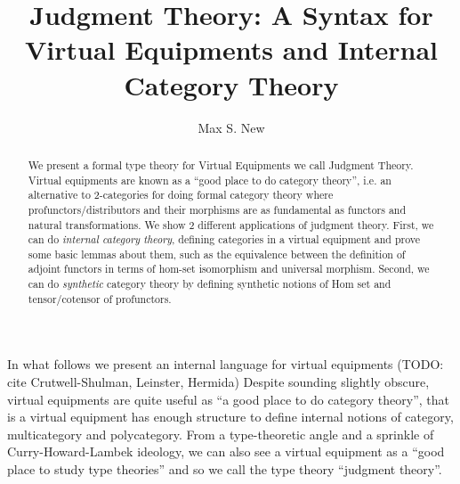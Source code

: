 \documentclass{article}
\begin{document}
\newtheorem{theorem}{Theorem}
\newtheorem{lemma}{Lemma}
\newtheorem{definition}{Definition}
\newcommand{\pto}{\nrightarrow}
\newcommand{\pfrom}{\nleftarrow}
\newcommand{\vcat}{\mathcal}
\newcommand{\cat}{\mathbbm}
\newcommand{\vtkmnd}{\mathbb{K}\text{Mod} (\vcat{V},T)}
\newcommand{\rmod}{\text{RMod}}
\newcommand{\lmod}{\text{LMod}}

\newcommand{\id}{\text{id}}
\newcommand{\for}{\text{for}\,}
\newcommand{\when}{\text{when}\,}
\newcommand{\lett}{\text{let}\,}
\newcommand{\sort}{\,\text{sort}}
\newcommand{\ctx}{\,\text{context}}
\newcommand{\pipe}{\mathrel{|}}

\title{Judgment Theory: A Syntax for Virtual Equipments and Internal Category Theory}
\author{Max S. New}

\maketitle

\begin{abstract}
  We present a formal type theory for Virtual Equipments we call
  Judgment Theory. Virtual equipments are known as a ``good place to
  do category theory'', i.e. an alternative to 2-categories for doing
  formal category theory where profunctors/distributors and their
  morphisms are as fundamental as functors and natural
  transformations. We show 2 different applications of judgment
  theory. First, we can do \emph{internal category theory}, defining
  categories in a virtual equipment and prove some basic lemmas about
  them, such as the equivalence between the definition of adjoint
  functors in terms of hom-set isomorphism and universal
  morphism. Second, we can do \emph{synthetic} category theory by
  defining synthetic notions of Hom set and tensor/cotensor of
  profunctors.
\end{abstract}

In what follows we present an internal language for virtual equipments
(TODO: cite Crutwell-Shulman, Leinster, Hermida)
%
Despite sounding slightly obscure, virtual equipments are quite useful
as ``a good place to do category theory'', that is a virtual equipment
has enough structure to define internal notions of category,
multicategory and polycategory.
%
From a type-theoretic angle and a sprinkle of Curry-Howard-Lambek
ideology, we can also see a virtual equipment as a ``good place to
study type theories'' and so we call the type theory ``judgment
theory''.
\end{document}
